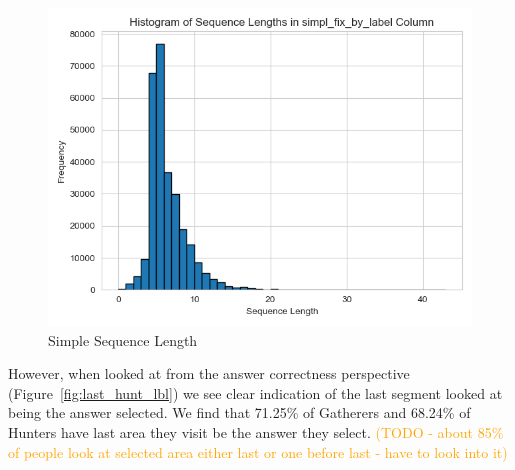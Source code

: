 \documentclass{article}
\begin{document}
    \begin{figure}[H]
        \centering
        \includegraphics[width=0.75\linewidth]{plots/sequence_freq/simpl_fix_by_label.png}
        \caption{Simple Sequence Length}
        \label{fig:length}
    \end{figure}

    However, when looked at from the answer correctness perspective (Figure~\ref{fig:last_hunt_lbl}) we see clear indication of the last segment looked at being the answer selected. We find that 71.25\% of Gatherers and 68.24\% of Hunters have last area they visit be the answer they select. \textcolor{orange}{(TODO  - about 85\% of people look at selected area either last or one before last - have to look into it)} 
\end{document}

